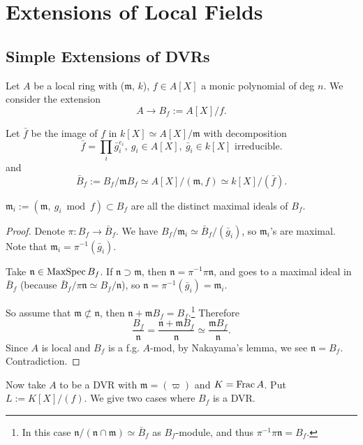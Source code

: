 \section{Extensions of Local Fields}

\subsection{Simple Extensions of DVRs}
Let $A$ be a local ring with ($\mathfrak{m}$, $k$), $f\in A[X]$ a monic polynomial of deg $n$.
We consider the extension \[A \to B_f := A[X]/f.\]

Let $\bar{f}$ be the image of $f$ in $k[X] \simeq A[X]/\mathfrak{m}$ with decomposition \[\bar{f} = \prod_{i}\bar{g}_i^{e_i},\ g_i\in A[X],\ \bar{g}_i\in k[X]\text{ irreducible.}\]
and \[\bar{B}_f := B_f/\mathfrak{m}B_f \simeq A[X]/(\mathfrak{m}, f) \simeq k[X]/(\bar{f}).\]
\begin{lemma}
    $\mathfrak{m}_i := (\mathfrak{m},\ g_i\bmod f)\subset B_f$ are all the distinct maximal ideals of $B_f$.
\end{lemma}
\begin{proof}
    Denote $\pi : B_f\to\bar{B}_f$. We have $B_f/\mathfrak{m}_i \simeq \bar{B}_f/(\bar{g}_i)$, so $\mathfrak{m}_i$'s are maximal.
    Note that $\mathfrak{m}_i = \pi^{-1}(\bar{g}_i)$.

    Take $\mathfrak{n}\in\operatorname{MaxSpec} B_f$.
    If $\mathfrak{n}\supset\mathfrak{m}$, then $\mathfrak{n} = \pi^{-1}\pi\mathfrak{n}$,
    and goes to a maximal ideal in $\bar{B}_f$ (because $\bar{B}_f/\pi\mathfrak{n} \simeq B_f/\mathfrak{n}$),
    so $\mathfrak{n} = \pi^{-1}(\bar{g}_i) = \mathfrak{m}_i$.

    So assume that $\mathfrak{m}\not\subset\mathfrak{n}$, then $\mathfrak{n} + \mathfrak{m}B_f = B_f$.\footnote{In this case $\mathfrak{n}/(\mathfrak{n\cap m})\simeq \bar{B}_f$ as $B_f$-module, and thus $\pi^{-1}\pi\mathfrak{n} = B_f$.}
    Therefore \[\frac{B_f}{\mathfrak{n}} = \frac{\mathfrak{n}+\mathfrak{m}B_f}{\mathfrak{n}} \simeq \frac{\mathfrak{m}B_f}{\mathfrak{n}}.\]
    Since $A$ is local and $B_f$ is a f.g. $A$-mod, by Nakayama's lemma, we see $\mathfrak{n} = B_f$. Contradiction.


\end{proof}

Now take $A$ to be a DVR with $\mathfrak{m} = (\varpi)$ and $K = \operatorname{Frac} A$. Put $L := K[X]/(f)$.
We give two cases where $B_f$ is a DVR.

